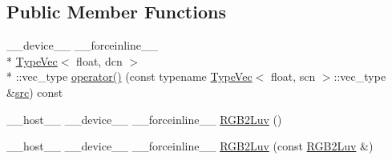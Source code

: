 \subsection*{Public Member Functions}
\begin{DoxyCompactItemize}
\item 
\-\_\-\-\_\-device\-\_\-\-\_\- \-\_\-\-\_\-forceinline\-\_\-\-\_\- \\*
\hyperlink{structcv_1_1gpu_1_1device_1_1TypeVec}{Type\-Vec}$<$ float, dcn $>$\\*
\-::vec\-\_\-type \hyperlink{structcv_1_1gpu_1_1device_1_1color__detail_1_1RGB2Luv_3_01float_00_01scn_00_01dcn_00_01srgb_00_01blueIdx_01_4_a28a66be514cd4c8bfce36af8812661bf}{operator()} (const typename \hyperlink{structcv_1_1gpu_1_1device_1_1TypeVec}{Type\-Vec}$<$ float, scn $>$\-::vec\-\_\-type \&\hyperlink{legacy_8hpp_a371cd109b74033bc4366f584edd3dacc}{src}) const 
\item 
\-\_\-\-\_\-host\-\_\-\-\_\- \-\_\-\-\_\-device\-\_\-\-\_\- \-\_\-\-\_\-forceinline\-\_\-\-\_\- \hyperlink{structcv_1_1gpu_1_1device_1_1color__detail_1_1RGB2Luv_3_01float_00_01scn_00_01dcn_00_01srgb_00_01blueIdx_01_4_a0dc85b9cfb0f1b744ad00ca801a5b51a}{R\-G\-B2\-Luv} ()
\item 
\-\_\-\-\_\-host\-\_\-\-\_\- \-\_\-\-\_\-device\-\_\-\-\_\- \-\_\-\-\_\-forceinline\-\_\-\-\_\- \hyperlink{structcv_1_1gpu_1_1device_1_1color__detail_1_1RGB2Luv_3_01float_00_01scn_00_01dcn_00_01srgb_00_01blueIdx_01_4_a60f7e3c075ae4bfe6c73864e0abad93d}{R\-G\-B2\-Luv} (const \hyperlink{structcv_1_1gpu_1_1device_1_1color__detail_1_1RGB2Luv}{R\-G\-B2\-Luv} \&)
\end{DoxyCompactItemize}


